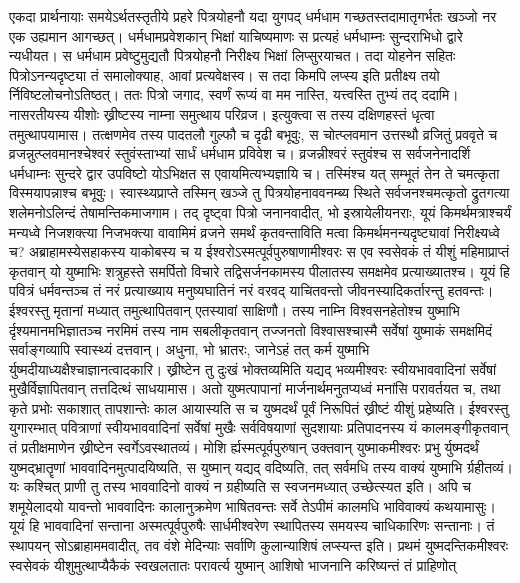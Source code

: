 \adhyAya
{}
\vakya एकदा प्रार्थनायाः समयेऽर्थतस्तृतीये प्रहरे पित्रयोहनौ यदा युगपद् धर्मधाम
\vakya गच्छतस्तदामातृगर्भतः खञ्जो नर एक उह्यमान आगच्छत्। धर्मधामप्रवेशकान् भिक्षां याचिष्यमाणः स प्रत्यहं धर्मधाम्नः सुन्दराभिधो द्वारे न्यधीयत।
\vakya स धर्मधाम प्रवेष्टुमुद्यतौ पित्रयोहनौ निरीक्ष्य भिक्षां लिप्सुरयाचत।
\vakya तदा योहनेन सहितः पित्रोऽनन्यदृष्ट्या तं समालोक्याह, आवां प्रत्यवेक्षस्व।
\vakya स तदा किमपि लप्स्य इति प्रतीक्ष्य तयो र्निविष्टलोचनोऽतिष्ठत्।
\vakya ततः पित्रो जगाद, स्वर्णं रूप्यं वा मम नास्ति, यत्त्वस्ति तुभ्यं तद् ददामि। नासरतीयस्य यीशोः ख्रीष्टस्य नाम्ना समुत्थाय परिव्रज।
\vakya इत्युक्त्वा स तस्य दक्षिणहस्तं धृत्वा तमुत्थापयामास। तत्क्षणमेव तस्य पादतलौ गुल्फौ च दृढी बभूवुः,
\vakya स चोत्प्लवमान उत्तस्थौ व्रजितुं प्रववृते च व्रजन्नुत्प्लवमानश्चेश्वरं स्तुवंस्ताभ्यां सार्धं धर्मधाम प्रविवेश च।
\vakya व्रजन्नीश्वरं स्तुवंश्च स सर्वजनेनादर्शि
\vakya धर्मधाम्नः सुन्दरे द्वार उपविष्टो योऽभिक्षत स एवायमित्यभ्यज्ञायि च। तस्मिंश्च यत् सम्भूतं तेन ते चमत्कृता विस्मयापन्नाश्च बभूवुः।
\vakya स्वास्थ्यप्राप्ते तस्मिन् खञ्जे तु पित्रयोहनाववनम्ब्य स्थिते सर्वजनश्चमत्कृतो द्रुतगत्या शलेमनोऽलिन्दं तेषामन्तिकमाजगाम।
\vakya तद् दृष्ट्वा पित्रो जनानवादीत्, भो इस्रायेलीयनराः, यूयं किमर्थमत्राश्चर्यं मन्यध्वे निजशक्त्या निजभक्त्या वावामिमं व्रजने समर्थं कृतवन्ताविति मत्वा किमर्थमनन्यदृष्ट्यावां निरीक्ष्यध्वे च?
\vakya अब्राहामस्येसहाकस्य याकोबस्य च य ईश्वरोऽस्मत्पूर्वपुरुषाणामीश्वरः स एव स्वसेवकं तं यीशुं महिमाप्राप्तं कृतवान् यो युष्माभिः शत्रुहस्ते समर्पितो विचारे तद्विसर्जनकामस्य पीलातस्य समक्षमेव प्रत्याख्यातश्च।
\vakya यूयं हि पवित्रं धर्मवन्तञ्च तं नरं प्रत्याख्याय मनुष्यघातिनं नरं वरवद् याचितवन्तो जीवनस्यादिकर्तारन्तु हतवन्तः।
\vakya ईश्वरस्तु मृतानां मध्यात् तमुत्थापितवान् एतस्यावां साक्षिणौ।
\vakya तस्य नाम्नि विश्वसनहेतोश्च युष्माभि र्दृश्यमानमभिज्ञातञ्च नरमिमं तस्य नाम सबलीकृतवान् तज्जनतो विश्वासश्चास्मै सर्वेषां युष्माकं समक्षमिदं सर्वाङ्गव्यापि स्वास्थ्यं दत्तवान्।
\vakya अधुना, भो भ्रातरः, जानेऽहं तत् कर्म युष्माभि र्युष्मदीयाध्यक्षैश्चाज्ञानत्वादकारि।
\vakya ख्रीष्टेन तु दुःखं भोक्तव्यमिति यद्यद् भव्यमीश्वरः स्वीयभाववादिनां सर्वेषां मुखैर्विज्ञापितवान् तत्तदित्थं साधयामास।
\vakya अतो युष्मत्पापानां मार्जनार्थमनुतप्यध्वं मनांसि परावर्तयत च,
\vakya तथा कृते प्रभोः सकाशात् तापशान्तेः काल आयास्यति स च युष्मदर्थं पूर्वं निरूपितं ख्रीष्टं यीशुं प्रहेष्यति।
\vakya ईश्वरस्तु युगारम्भात् पवित्राणां स्वीयभाववादिनां सर्वेषां मुखैः सर्वविषयाणां सुदशायाः प्रतिपादनस्य यं कालमङ्गीकृतवान् तं प्रतीक्षमाणेन ख्रीष्टेन स्वर्गेऽवस्थातव्यं।
\vakya मोशि र्ह्यस्मत्पूर्वपुरुषान् उक्तवान् युष्माकमीश्वरः प्रभु र्युष्मदर्थं युष्मद्भ्रातॄणां भाववादिनमुत्पादयिष्यति, स युष्मान् यद्यद् वदिष्यति, तत् सर्वमधि तस्य वाक्यं युष्माभि र्ग्रहीतव्यं।
\vakya यः कश्चित् प्राणी तु तस्य भाववादिनो वाक्यं न ग्रहीष्यति स स्वजनमध्यात् उच्छेत्स्यत इति।
\vakya अपि च शमूयेलादयो यावन्तो भाववादिनः कालानुक्रमेण भाषितवन्तः सर्वे तेऽपीमं कालमधि भाविवाक्यं कथयामासुः।
\vakya यूयं हि भाववादिनां सन्ताना अस्मत्पूर्वपुरुषैः सार्धमीश्वरेण स्थापितस्य समयस्य चाधिकारिणः सन्तानाः। तं स्थापयन् सोऽब्राहाममवादीत्, तव वंशे मेदिन्याः सर्वाणि कुलान्याशिषं लप्स्यन्त इति।
\vakya प्रथमं युष्मदन्तिकमीश्वरः स्वसेवकं यीशुमुत्थाप्यैकैकं स्वखलतातः परावर्त्य युष्मान् आशिषो भाजनानि करिष्यन्तं तं प्राहिणोत्\eoc